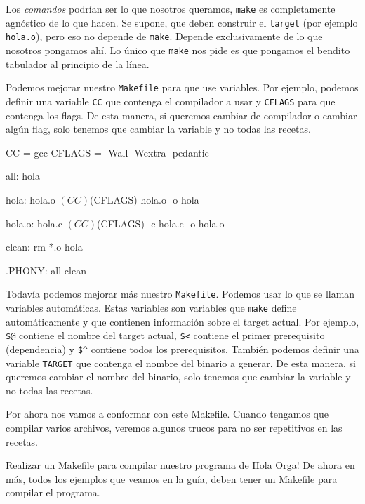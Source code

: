 \documentclass[]{scrartcl}
\begin{document}
\begin{notebox}
  Los \textit{comandos} podrían ser lo que nosotros queramos, \texttt{make} es completamente agnóstico de lo que hacen. Se supone, que deben construir el \texttt{target} (por ejemplo \texttt{hola.o}), pero eso no depende de \texttt{make}. Depende exclusivamente de lo que nosotros pongamos ahí. Lo único que \texttt{make} nos pide es que pongamos el bendito tabulador al principio de la línea.
\end{notebox}

Podemos mejorar nuestro \texttt{Makefile} para que use variables. Por ejemplo, podemos definir una variable \texttt{CC} que contenga el compilador a usar y \texttt{CFLAGS} para que contenga los flags. De esta manera, si queremos cambiar de compilador o cambiar algún flag, solo tenemos que cambiar la variable y no todas las recetas.

\begin{bashbox}[minted language=make]
  CC = gcc
  CFLAGS = -Wall -Wextra -pedantic
  
  all: hola
  
  hola: hola.o
  	$(CC) $(CFLAGS) hola.o -o hola
  
  hola.o: hola.c
  	$(CC) $(CFLAGS) -c hola.c -o hola.o
  
  clean:
  	rm *.o hola

  .PHONY: all clean
\end{bashbox}

Todavía podemos mejorar más nuestro \texttt{Makefile}. Podemos usar lo que se llaman variables automáticas. Estas variables son variables que \texttt{make} define automáticamente y que contienen información sobre el target actual. Por ejemplo, \texttt{\$@} contiene el nombre del target actual, \texttt{\$<} contiene el primer prerequisito (dependencia) y \texttt{\$\^} contiene todos los prerequisitos. También podemos definir una variable \texttt{TARGET} que contenga el nombre del binario a generar. De esta manera, si queremos cambiar el nombre del binario, solo tenemos que cambiar la variable y no todas las recetas.


Por ahora nos vamos a conformar con este Makefile. Cuando tengamos que compilar varios archivos, veremos algunos trucos para no ser repetitivos en las recetas.

\begin{exbox}[label=ejercicio1]
  Realizar un Makefile para compilar nuestro programa de Hola Orga! De ahora en más, todos los ejemplos que veamos en la guía, deben tener un Makefile para compilar el programa.
\end{exbox}
\end{document}
